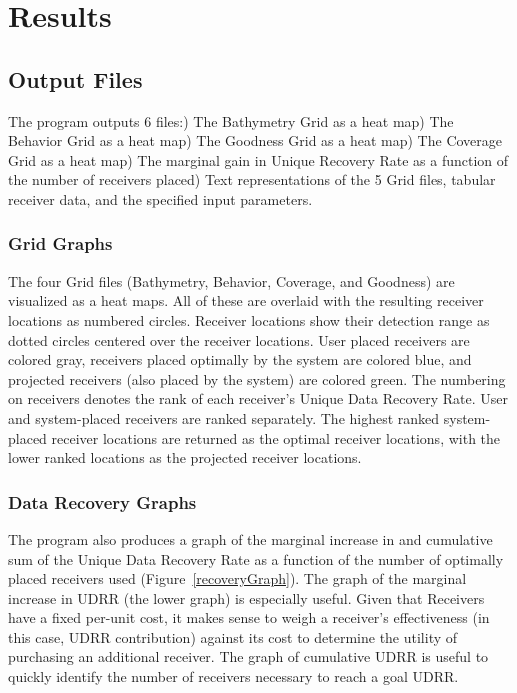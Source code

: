 \chapter{Results}
\section{Output Files}
\label{outputFiles}
The program outputs 6 files:) The Bathymetry Grid as a heat map) The Behavior Grid as a heat map) The Goodness Grid as a heat map) The Coverage Grid as a heat map) The marginal gain in Unique Recovery Rate as a function of the number of receivers placed) Text representations of the 5 Grid files, tabular receiver data, and the specified input parameters.\newline

\subsection{Grid Graphs}
The four Grid files (Bathymetry, Behavior, Coverage, and Goodness) are visualized as a heat maps.  All of these are overlaid with the resulting receiver locations as numbered circles.  Receiver locations show their detection range as dotted circles centered over the receiver locations.  User placed receivers are colored gray, receivers placed optimally by the system are colored blue, and projected receivers (also placed by the system) are colored green.  The numbering on receivers denotes the rank of each receiver's Unique Data Recovery Rate.  User and system-placed receivers are ranked separately.  The highest ranked system-placed receiver locations are returned as the optimal receiver locations, with the lower ranked locations as the projected receiver locations.


\subsection{Data Recovery Graphs}
The program also produces a graph of the marginal increase in and cumulative sum of the Unique Data Recovery Rate as a function of the number of optimally placed receivers used (Figure~\ref{recoveryGraph}).  The graph of the marginal increase in UDRR (the lower graph) is especially useful.  Given that Receivers have a fixed per-unit cost, it makes sense to weigh a receiver's effectiveness (in this case, UDRR contribution) against its cost to determine the utility of purchasing an additional receiver.  The graph of cumulative UDRR is useful to quickly identify the number of receivers necessary to reach a goal UDRR.

